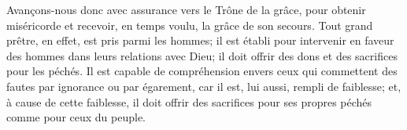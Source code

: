 Avançons-nous donc avec assurance vers le Trône de la grâce,
	pour obtenir miséricorde et recevoir, en temps voulu, la grâce de son secours.
Tout grand prêtre, en effet, est pris parmi les hommes;
	il est établi pour intervenir en faveur des hommes dans leurs relations avec Dieu;
	il doit offrir des dons et des sacrifices pour les péchés.
Il est capable de compréhension
		envers ceux qui commettent des fautes par ignorance ou par égarement,
	car il est, lui aussi, rempli de faiblesse;
	et, à cause de cette faiblesse, il doit offrir des sacrifices
	pour ses propres péchés comme pour ceux du peuple.
